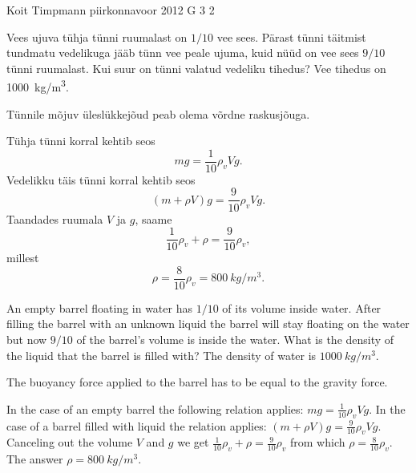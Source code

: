 {Koit Timpmann} %
{piirkonnavoor} %
{2012} %
{G 3} %
{2} %
{
\ifStatement
Vees ujuva tühja tünni ruumalast on $1/10$ vee sees. Pärast tünni täitmist
tundmatu vedelikuga jääb tünn vee peale ujuma, kuid nüüd on vee sees $9/10$ tünni
ruumalast. Kui suur on tünni valatud vedeliku tihedus? Vee tihedus on
\SI{1000}{kg/m^3}.
\fi


\ifHint
Tünnile mõjuv üleslükkejõud peab olema võrdne raskusjõuga.
\fi


\ifSolution
Tühja tünni korral kehtib seos
\[
mg=\frac 1{10}\rho_vVg.
\]
Vedelikku täis tünni korral kehtib seos	
\[
(m+\rho V)g=\frac 9{10}\rho_vVg.
\]
Taandades ruumala $V$ ja $g$, saame
\[
\frac 1{10}\rho_v+\rho=\frac 9{10}\rho_v,
\]
millest 
\[
\rho=\frac 8{10}\rho_v = \SI{800}{kg/m^3}.
\]
\fi


\ifEngStatement
An empty barrel floating in water has $1/10$ of its volume inside water. After filling the barrel with an unknown liquid the barrel will stay floating on the water but now $9/10$ of the barrel’s volume is inside the water. What is the density of the liquid that the barrel is filled with? The density of water is $\SI{1000}{kg/m^3}$.
\fi


\ifEngHint
The buoyancy force applied to the barrel has to be equal to the gravity force.
\fi


\ifEngSolution
In the case of an empty barrel the following relation applies: $mg=\frac 1{10}\rho_vVg$. In the case of a barrel filled with liquid the relation applies: $(m+\rho V)g=\frac 9{10}\rho_vVg$. Canceling out the volume $V$ and $g$ we get $\frac 1{10}\rho_v+\rho=\frac 9{10}\rho_v$ from which $\rho=\frac 8{10}\rho_v$. The answer $\rho= \SI{800}{kg/m^3}$.
\fi
}